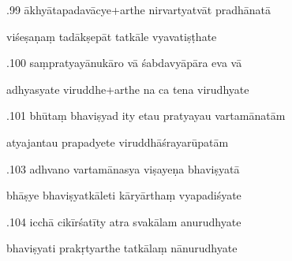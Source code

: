 \documentclass[article,12pt,a4paper]{memoir}%
\newcounter{parCount}
\begin{document}
	  
	  \pstart {}.99 ākhyātapadavācye+arthe nirvartyatvāt pradhānatā 
	{}
	\pend%
      

	  
	  \pstart \leavevmode%
	viśeṣaṇaṃ tadākṣepāt tatkāle vyavatiṣṭhate 
	{}
	\pend%
      

	  
	  \pstart {}.100 saṃpratyayānukāro vā śabdavyāpāra eva vā 
	{}
	\pend%
      

	  
	  \pstart \leavevmode%
	adhyasyate viruddhe+arthe na ca tena virudhyate 
	{}
	\pend%
      

	  
	  \pstart {}.101 bhūtaṃ bhaviṣyad ity etau pratyayau vartamānatām 
	{}
	\pend%
      

	  
	  \pstart \leavevmode%
	atyajantau prapadyete viruddhāśrayarūpatām 
	{}
	\pend%
      

	  
	  \pstart {}.103 adhvano vartamānasya viṣayeṇa bhaviṣyatā 
	{}
	\pend%
      

	  
	  \pstart \leavevmode%
	bhāṣye bhaviṣyatkāleti kāryārthaṃ vyapadiśyate 
	{}
	\pend%
      

	  
	  \pstart {}.104 icchā cikīrśatīty atra svakālam anurudhyate 
	{}
	\pend%
      

	  
	  \pstart \leavevmode%
	bhaviṣyati prakṛtyarthe tatkālaṃ nānurudhyate 
	{}
	\pend%
      
\end{document}
